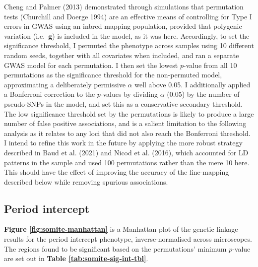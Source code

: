 \documentclass[
]{book}
\begin{document}
Cheng and Palmer (2013) demonstrated through simulations that permutation tests (Churchill and Doerge 1994) are an effective means of controlling for Type I errors in GWAS using an inbred mapping population, provided that polygenic variation (i.e.~\(\pmb{g}\)) is included in the model, as it was here. Accordingly, to set the significance threshold, I permuted the phenotype across samples using 10 different random seeds, together with all covariates when included, and ran a separate GWAS model for each permutation. I then set the lowest \(p\)-value from all 10 permutations as the significance threshold for the non-permuted model, approximating a deliberately permissive \(\alpha\) well above 0.05. I additionally applied a Bonferroni correction to the \(p\)-values by dividing \(\alpha\) (0.05) by the number of pseudo-SNPs in the model, and set this as a conservative secondary threshold. The low significance threshold set by the permutations is likely to produce a large number of false positive associations, and is a salient limitation to the following analysis as it relates to any loci that did not also reach the Bonferroni threshold. I intend to refine this work in the future by applying the more robust strategy described in Baud et al. (2021) and Nicod et al. (2016), which accounted for LD patterns in the sample and used 100 permutations rather than the mere 10 here. This should have the effect of improving the accuracy of the fine-mapping described below while removing spurious associations.

\hypertarget{period-intercept}{%
\subsection{Period intercept}\label{period-intercept}}

\textbf{Figure \ref{fig:somite-manhattan}} is a Manhattan plot of the genetic linkage results for the period intercept phenotype, inverse-normalised across microscopes. The regions found to be significant based on the permutations' minimum \(p\)-value are set out in \textbf{Table \ref{tab:somite-sig-int-tbl}}.
\end{document}
